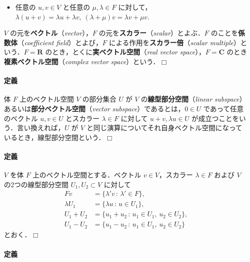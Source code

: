 \documentclass[b5paper,pandoc]{bxjsarticle}
\providecommand{\tightlist}{%
  \setlength{\itemsep}{0pt}\setlength{\parskip}{0pt}}
\let\oldparagraph\paragraph
\renewcommand{\paragraph}[1]{\oldparagraph{#1}\mbox{}}
\begin{document}
\begin{itemize}
\tightlist
\item
  任意の \(u, v \in V\) と任意の \(\mu, \lambda \in F\)
  に対して，\(\lambda (u + v) = \lambda u + \lambda v,\ (\lambda + \mu) v = \lambda v + \mu v\).
\end{itemize}

\(V\) の元を\textbf{ベクトル}（\emph{vector}），\(F\)
の元を\textbf{スカラー}（\emph{scalar}）とよぶ．\(F\)
のことを\textbf{係数体}（\emph{coefficient field}）とよび，\(F\)
による作用を\textbf{スカラー倍}（\emph{scalar
multiple}）という．\(F = \boldsymbol R\)
のとき，とくに\textbf{実ベクトル空間}（\emph{real vector
space}），\(F = \boldsymbol C\)
のとき\textbf{複素ベクトル空間}（\emph{complex vector
space}）という．\(\Box\)

\hypertarget{linear-subspace}{%
\paragraph{定義}\label{linear-subspace}}

体 \(F\) 上のベクトル空間 \(V\) の部分集合 \(U\) が \(V\)
の\textbf{線型部分空間}（\emph{linear
subspace}）あるいは\textbf{部分ベクトル空間}（\emph{vector
subspace}）であるとは，\(0 \in U\) であって任意のベクトル \(u, v \in U\)
とスカラー \(\lambda \in F\) に対して \(u + v, \lambda u \in U\)
が成立つことをいう．言い換えれば，\(U\) が \(V\)
と同じ演算についてそれ自身ベクトル空間になっているとき，線型部分空間という．\(\Box\)

\hypertarget{operation-of-spaces}{%
\paragraph{定義}\label{operation-of-spaces}}

\(V\) を体 \(F\) 上のベクトル空間とする．ベクトル \(v \in V\)，スカラー
\(\lambda \in F\) および \(V\) の2つの線型部分空間
\(U_1, U_2 \subset V\) に対して \begin{align*}
Fv &= \{ \lambda' v \,:\,\lambda' \in F \},\\
\lambda U_1 &= \{ \lambda u \,:\,u \in U_1 \},\\
U_1 + U_2 &= \{ u_1 + u_2 \,:\,u_1 \in U_1,\ u_2 \in U_2 \},\\
U_1 - U_2 &= \{ u_1 - u_2 \,:\,u_1 \in U_1,\ u_2 \in U_2 \}
\end{align*} とおく．\(\Box\)

\hypertarget{linear-independence}{%
\paragraph{定義}\label{linear-independence}}
\end{document}
